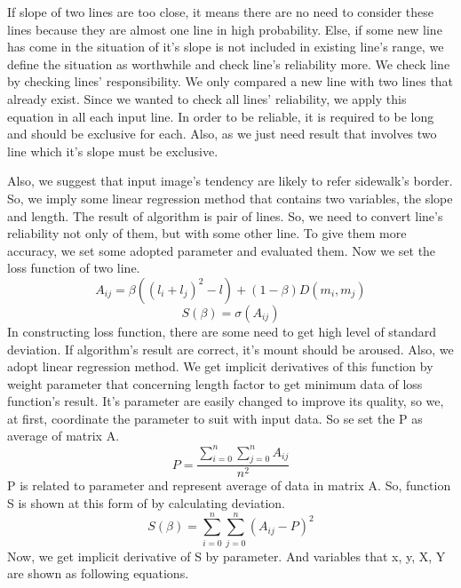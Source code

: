 If slope of two lines are too close, it means there are no need to consider these lines because they are almost one line in high probability. Else, if some new line has come in the situation of it's slope is not included in existing line's range, we define the situation as worthwhile and check line's reliability more. We check line by checking lines’ responsibility. We only compared a new line with two lines that already exist. Since we wanted to check all lines’ reliability, we apply this equation in all each input line. \newline
In order to be reliable, it is required to be long and should be exclusive for each. Also, as we just need result that involves two line which it's slope must be exclusive.

Also, we suggest that input image's tendency are likely to refer sidewalk's border. So, we imply some linear regression method that contains two variables, the slope and length.
The result of algorithm is pair of lines. So, we need to convert line's reliability not only of them, but with some other line. To give them more accuracy, we set some adopted parameter and evaluated them. Now we set the loss function of two line.
\begin{equation}
\mathit{A_{ij} = \beta((l_{i}+l_{j})^{2} - l) +(1-\beta)D(m_i,m_j)}
\end{equation}
\begin{equation}
\mathit{S(\beta) =\sigma(A_{ij})}
\end{equation}
In constructing loss function, there are some need to get high level of standard deviation. If algorithm's result are correct, it's mount should be aroused. Also, we adopt linear regression method. We get implicit derivatives of this function by weight parameter that concerning length factor to get minimum data of loss function's result. It's parameter are easily changed to improve its quality, so we, at first, coordinate the parameter to suit with input data. So se set the P as average of matrix A.
\begin{equation}
\mathit{P = \frac{\sum_{i=0}^{n}{\sum_{j=0}^{n}{A_{ij}}}}{n^{2}}}
\end{equation}
P is related to parameter and represent average of data in matrix A. So, function S is shown at this form of by calculating deviation.
\begin{equation}
\mathit{S(\beta)} =\sum_{i=0}^{n}{\sum_{j=0}^{n}{(A_{ij} - P)^{2}}}
\end{equation}
Now, we get implicit derivative of S by parameter. And variables that x, y, X, Y are shown as following equations.
